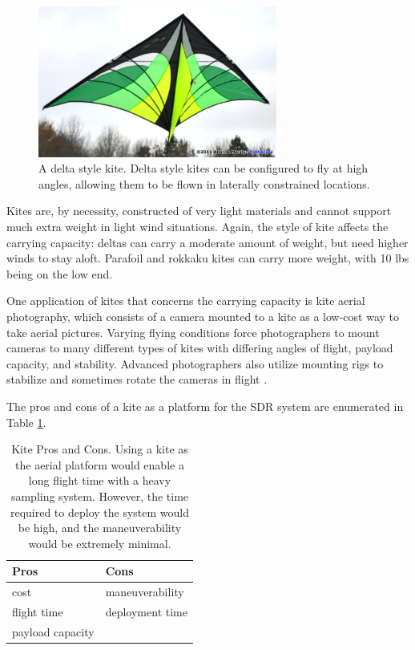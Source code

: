 \begin{figure}[ht]
\centering
\includegraphics[width=0.70\textwidth]{img/delta-kite.jpg}
\caption{A delta style kite. Delta style kites can be configured to fly at high angles, allowing them to be flown in laterally constrained locations. \cite{kite_img}}
\label{fig:delta_kite}
\end{figure}\par
Kites are, by necessity, constructed of very light materials and cannot support much extra weight in light wind situations. Again, the style of kite affects the carrying capacity: deltas can carry a moderate amount of weight, but need higher winds to stay aloft. Parafoil and rokkaku kites can carry more weight, with 10 lbs being on the low end.\par
One application of kites that concerns the carrying capacity is kite aerial photography, which consists of a camera mounted to a kite as a low-cost way to take aerial pictures\cite{kite_iqp}. Varying flying conditions force photographers to mount cameras to many different types of kites with differing angles of flight, payload capacity, and stability. Advanced photographers also utilize mounting rigs to stabilize and sometimes rotate the cameras in flight \cite{kite_iqp}.\par
The pros and cons of a kite as a platform for the SDR system are enumerated in Table \ref{table:kite_pc}.
\begin{table}[ht]
\centering
\caption{Kite Pros and Cons. Using a kite as the aerial platform would enable a long flight time with a heavy sampling system. However, the time required to deploy the system would be high, and the maneuverability would be extremely minimal.}
\label{table:kite_pc}
\begin{tabular}{l|l}
  Pros & Cons \\ \hline
  cost & maneuverability \\
  flight time & deployment time \\
  payload capacity & \\
\end{tabular}
\end{table}\par

